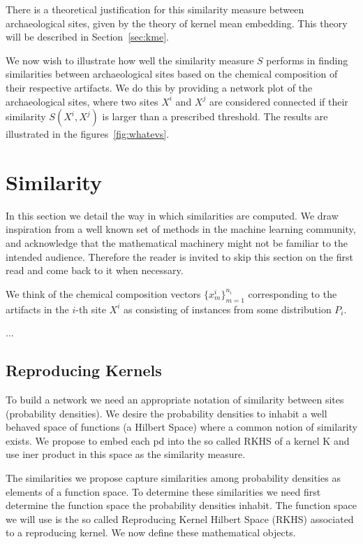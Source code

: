 There is a theoretical justification for this similarity measure between archaeological sites, given by the theory of kernel mean embedding. This theory will be described in Section~\ref{sec:kme}.

We now wish to illustrate how well the similarity measure $S$ performs in finding similarities between archaeological sites based on the chemical composition of their respective artifacts. We do this by providing a network plot of the archaeological sites, where two sites $X^i$ and $X^j$ are considered connected if their similarity $S(X^i,X^j)$ is larger than a prescribed threshold. The results are illustrated in the figures~\ref{fig:whatevs}.

\section{Similarity}

\label{sec:similarity}

In this section we detail the way in which similarities are computed. We draw inspiration from a well known set of methods in the machine learning community, and acknowledge that the mathematical machinery might not be familiar to the intended audience. Therefore the reader is invited to skip this section on the first read and come back to it when necessary.

We think of the chemical composition vectors $\{x^i_m\}_{m=1}^{n_i}$ corresponding to the artifacts in the $i$-th site $X^i$ as consisting of instances from some distribution $P_i$.

...

\subsection{Reproducing Kernels}

\label{kernels}

To build a network we need an appropriate notation of similarity between sites (probability densities). We desire the probability densities to inhabit a well behaved space of functions (a Hilbert Space) where a common notion of similarity exists. We propose to embed each pd into the so called RKHS of a kernel K and use iner product in this space as the similarity measure.

The similarities we propose capture similarities among probability densities as elements of a function space. To determine these similarities we need first determine the function space the probability densities inhabit. The function space we will use is the so called Reproducing Kernel Hilbert Space (RKHS) associated to a reproducing kernel. We now define these mathematical objects.

